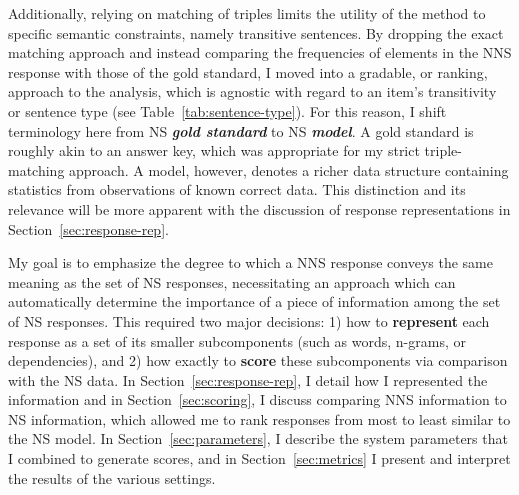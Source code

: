 Additionally, relying on matching of triples limits the utility of the method to specific semantic constraints, namely transitive sentences. By dropping the exact matching approach and instead comparing the frequencies of elements in the NNS response with those of the gold standard, I moved into a gradable, or ranking, approach to the analysis, which is agnostic with regard to an item's transitivity or sentence type (see Table~\ref{tab:sentence-type}). For this reason, I shift terminology here from NS \textit{\textbf{gold standard}} to NS \textit{\textbf{model}}. A gold standard is roughly akin to an answer key, which was appropriate for my strict triple-matching approach. A model, however, denotes a richer data structure containing statistics from observations of known correct data. This distinction and its relevance will be more apparent with the discussion of response representations in Section~\ref{sec:response-rep}.

My goal is to emphasize the degree to which a NNS response conveys the same
meaning as the set of NS responses, necessitating an approach which can automatically
determine the importance of a piece of information among the set of NS responses.  This required two major decisions: 1) how to \textbf{represent} each response as a set of its smaller subcomponents (such as words, n-grams, or dependencies), and 2) how exactly to \textbf{score} these subcomponents via comparison with the NS data. In Section~\ref{sec:response-rep}, I detail how I represented the information and in Section~\ref{sec:scoring}, I discuss comparing NNS information to NS information, which allowed me to rank responses from most to least similar to the NS model. In Section~\ref{sec:parameters}, I describe the system parameters that I combined to generate scores, and in Section~\ref{sec:metrics} I present and interpret the results of the various settings.

%
%
